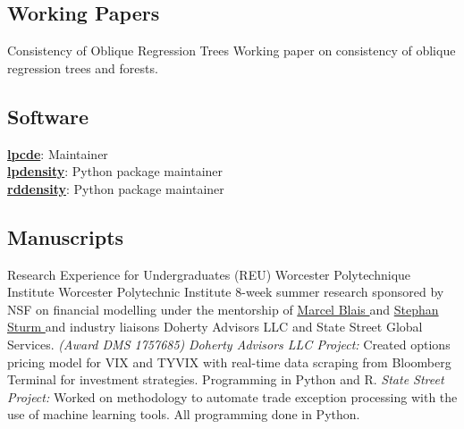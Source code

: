 \documentclass[10pt,a4paper,roman]{moderncv}        %
\begin{document}
\subsection{Working Papers}
{Consistency of Oblique Regression Trees}{}{}
{Working paper on consistency of oblique regression trees and forests.}

\subsection{Software}
\color{blue}\href{https://nppackages.github.io/lpcde/}{\textbf{lpcde}}\color{black}: Maintainer
\\
\color{blue}\href{https://nppackages.github.io/lpdensity_doc/}{\textbf{lpdensity}}\color{black}: Python package maintainer
\\
\color{blue}\href{https://rdpackages.github.io/rddensity_doc/}{\textbf{rddensity}}\color{black}: Python package maintainer

\subsection{Manuscripts}

{Research Experience for Undergraduates (REU) }
{Worcester Polytechnique Institute}
{Worcester Polytechnic Institute}
{8-week summer research sponsored by NSF on financial modelling under the
  mentorship of
  \color{blue}\href{https://www.wpi.edu/people/faculty/myblais}{Marcel Blais
  }\color{black}
  and \color{blue}\href{https://www.wpi.edu/people/faculty/ssturm}{Stephan Sturm
  }\color{black}
  and industry liaisons Doherty Advisors LLC and State Street Global Services.
  \textit{(Award DMS 1757685)}
  \newline{}%
\textit{Doherty Advisors LLC Project:}
Created options pricing model for VIX and TYVIX with real-time data scraping
from Bloomberg Terminal for investment strategies.
Programming in Python and R.
\newline{}
\textit{State Street Project:}
Worked on methodology to automate trade exception processing with the use of
machine learning tools. All programming done in Python.
}
\end{document}
